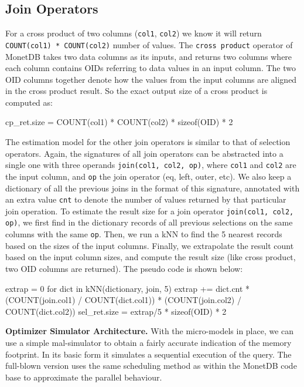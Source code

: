 \documentclass[conference]{IEEEtran}
\def\Skip{\par\medskip\nobreak\noindent}
\begin{document}
\subsection{Join Operators}
For a cross product of two columns (\texttt{\small col1}, \texttt{\small col2}) we know it will return \texttt{\small COUNT(col1) * COUNT(col2)} number of values.
The \texttt{\small cross product} operator of MonetDB takes two data columns as its inputs, and returns two columns where each column contains OIDs referring to data values in an input column.
The two OID columns together denote how the values from the input columns are aligned in the cross product result.
So the exact output size of a cross product is computed as:
\begin{verb}
cp_ret.size = COUNT(col1) * COUNT(col2) * sizeof(OID) * 2
\end{verb}

The estimation model for the other join operators is similar to that of selection operators.
Again, the signatures of all join operators can be abstracted into a single one with three operands \texttt{\small join(col1, col2, op)}, where \texttt{\small col1} and \texttt{\small col2} are the input column, and \texttt{\small op} the join operator (eq, left, outer, etc).
We also keep a dictionary of all the previous joins in the format of this signature, annotated with an extra value \texttt{\small cnt} to denote the number of values returned by that particular join operation.
To estimate the result size for a join operator \texttt{\small join(col1, col2, op)}, we first find in the dictionary records of all previous selections on the same columns with the same \texttt{\small op}. 
Then, we run a kNN to find the 5 nearest records based on the sizes of the input columns.
Finally, we extrapolate the result count based on the input column sizes, and compute the result size (like cross product, two OID columns are returned).
The pseudo code is shown below:
\begin{verb}
extrap = 0
for dict in kNN(dictionary, join, 5)
  extrap += dict.cnt * (COUNT(join.col1) / COUNT(dict.col1)) * 
                       (COUNT(join.col2) / COUNT(dict.col2))
sel_ret.size = extrap/5 * sizeof(OID) * 2
\end{verb}

\Skip\textbf{Optimizer Simulator Architecture.}
With the micro-models in place, we can use a simple {\sc mal}-simulator to obtain a fairly accurate indication of the memory footprint.
In its basic form it simulates a sequential execution of the query.
The full-blown version uses the same scheduling method as within the MonetDB code base to approximate the parallel behaviour.
\end{document}
